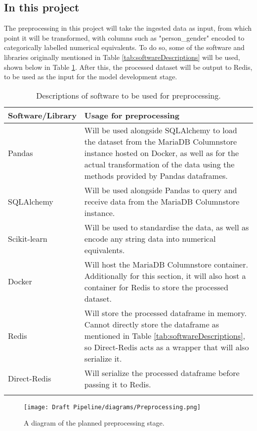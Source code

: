 \subsection{In this project}
The preprocessing in this project will take the ingested data as input, from which point it will be transformed,
with columns such as "person\_gender" encoded to categorically labelled numerical equivalents. To do so, some of the software
and libraries originally mentioned in Table \ref{tab:softwareDescriptions} will be used, shown below in Table \ref{tab:PreprocessingSoftware}.
After this, the processed dataset will be output to Redis, to be used as the input for the model development stage.


\begin{longtable}{ |p{}| p{}|}
    \hline
    \cellcolor{blue!25}Software/Library & \cellcolor{blue!25}Usage for preprocessing\\
    \hline
    Pandas & 
    Will be used alongside SQLAlchemy to load the dataset from the MariaDB Columnstore instance hosted on Docker, 
    as well as for the actual transformation of the data using the methods provided by Pandas dataframes.\\
    \hline
    SQLAlchemy & 
    Will be used alongside Pandas to query and receive data from the MariaDB Columnstore instance.\\
    \hline
    Scikit-learn & 
    Will be used to standardise the data, as well as encode any string data into numerical 
    equivalents.\\
    \hline
    Docker &
    Will host the MariaDB Columnstore container. Additionally for this section, it will also host a 
    container for Redis to store the processed dataset.\\
    \hline
    Redis &
    Will store the processed dataframe in memory. Cannot directly store the dataframe as mentioned in 
    Table \ref{tab:softwareDescriptions}, so Direct-Redis acts as a wrapper that will also serialize it.\\
    \hline
    Direct-Redis & 
    Will serialize the processed dataframe before passing it to Redis.\\
    \hline
\caption{Descriptions of software to be used for preprocessing.}\label{tab:PreprocessingSoftware}
\end{longtable}

\begin{figure}[H]
    \centering
    \texttt{[image: Draft Pipeline/diagrams/Preprocessing.png]}
    \caption{A diagram of the planned preprocessing stage.}
    \label{fig:PreprocessingDiagram}
\end{figure}


